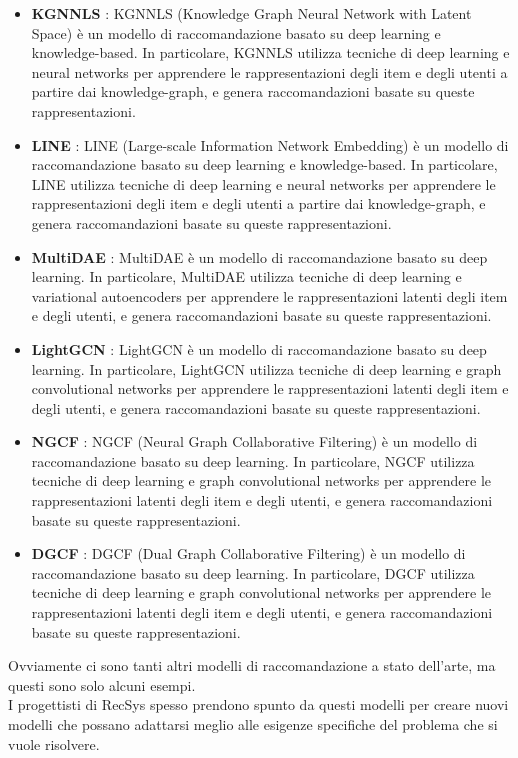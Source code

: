 \begin{itemize}
    \item \textbf{KGNNLS} \cite{KGNNLS}: KGNNLS (Knowledge Graph Neural Network with Latent Space) è un modello di raccomandazione basato su deep learning e knowledge-based. In particolare, KGNNLS utilizza tecniche di deep learning e neural networks per apprendere le rappresentazioni degli item e degli utenti a partire dai knowledge-graph, e genera raccomandazioni basate su queste rappresentazioni.
    \item \textbf{LINE} \cite{LINE}: LINE (Large-scale Information Network Embedding) è un modello di raccomandazione basato su deep learning e knowledge-based. In particolare, LINE utilizza tecniche di deep learning e neural networks per apprendere le rappresentazioni degli item e degli utenti a partire dai knowledge-graph, e genera raccomandazioni basate su queste rappresentazioni.
    \item \textbf{MultiDAE} \cite{MultiDAE}: MultiDAE è un modello di raccomandazione basato su deep learning. In particolare, MultiDAE utilizza tecniche di deep learning e variational autoencoders per apprendere le rappresentazioni latenti degli item e degli utenti, e genera raccomandazioni basate su queste rappresentazioni.
    \item \textbf{LightGCN} \cite{LightGCN}: LightGCN è un modello di raccomandazione basato su deep learning. In particolare, LightGCN utilizza tecniche di deep learning e graph convolutional networks per apprendere le rappresentazioni latenti degli item e degli utenti, e genera raccomandazioni basate su queste rappresentazioni.
    \item \textbf{NGCF} \cite{NGCF}: NGCF (Neural Graph Collaborative Filtering) è un modello di raccomandazione basato su deep learning. In particolare, NGCF utilizza tecniche di deep learning e graph convolutional networks per apprendere le rappresentazioni latenti degli item e degli utenti, e genera raccomandazioni basate su queste rappresentazioni.
    \item \textbf{DGCF} \cite{DGCF}: DGCF (Dual Graph Collaborative Filtering) è un modello di raccomandazione basato su deep learning. In particolare, DGCF utilizza tecniche di deep learning e graph convolutional networks per apprendere le rappresentazioni latenti degli item e degli utenti, e genera raccomandazioni basate su queste rappresentazioni.
\end{itemize}


\noindent Ovviamente ci sono tanti altri modelli di raccomandazione a stato dell'arte, ma questi sono solo alcuni esempi.\\
I progettisti di RecSys spesso prendono spunto da questi modelli per creare nuovi modelli che possano adattarsi meglio alle esigenze specifiche del problema che si vuole risolvere.\\



